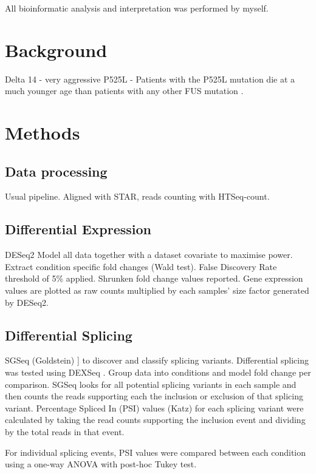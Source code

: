 All bioinformatic analysis and interpretation was performed by myself. 

\section{Background}


Delta 14 - very aggressive
P525L - Patients with the P525L mutation die at a much younger age than patients with any other FUS mutation \citep{Shang2016}.


\section{Methods}

\subsection{Data processing}
Usual pipeline. Aligned with STAR, reads counting with HTSeq-count. 

\subsection{Differential Expression}
DESeq2 \citep{Love2014}
Model all data together with a dataset covariate to maximise power.
Extract condition specific fold changes (Wald test). False Discovery Rate threshold of 5\% applied. Shrunken fold change values reported. Gene expression values are plotted as raw counts multiplied by each samples’ size factor generated by DESeq2.

\subsection{Differential Splicing}
SGSeq (Goldstein) \citep{Goldstein2016}] to discover and classify splicing variants. Differential splicing was tested using DEXSeq \cite{Anders2012}.
Group data into conditions and model fold change per comparison. SGSeq looks for all potential splicing variants in each sample and then counts the reads supporting each the inclusion or exclusion of that splicing variant. 
Percentage Spliced In (PSI) values (Katz) \citep{Katz2010-ir} for each splicing variant were calculated by taking the read counts supporting the inclusion event and dividing by the total reads in that event. 

For individual splicing events, PSI values were compared between each condition using a one-way ANOVA with post-hoc Tukey test.

